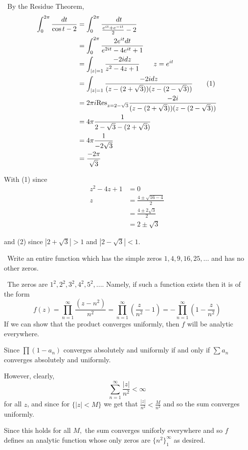 \documentclass[12pt]{Qual}
\begin{document}
\begin{solution}$\,$ By the Residue Theorem,
\begin{align*}
    \int_0^{2\pi}\frac{dt}{\cos t-2}&=\int_0^{2\pi}\frac{dt}{\frac{e^{it}+e^{-it}}{2}-2}\\
    &=\int_0^{2\pi}\frac{2e^{it}dt}{e^{2it}-4e^{it}+1}\\
    &=\int_{|z|=1}\frac{-2idz}{z^2-4z+1}\qquad z=e^{it}\\
    &=\int_{|z|=1}\frac{-2idz}{(z-(2+\sqrt{3}))(z-(2-\sqrt{3}))}\tag{1}\\
    &=2\pi i\text{Res}_{z=2-\sqrt{3}}\frac{-2i}{(z-(2+\sqrt{3}))(z-(2-\sqrt{3}))}\\
    &=4\pi\frac{1}{2-\sqrt{3}-(2+\sqrt{3})}\\
    &=4\pi\frac{1}{-2\sqrt{3}}\\
    &=\frac{-2\pi}{\sqrt{3}}
\end{align*}

With (1) since \begin{align*}
    z^2-4z+1&=0\\
    z&=\frac{4\pm\sqrt{16-4}}{2}\\
    &=\frac{4\pm 2\sqrt{3}}{2}\\
    &=2\pm\sqrt{3}
\end{align*}

and (2) since $|2+\sqrt{3}|>1$ and $|2-\sqrt{3}|<1$.
\end{solution}
\newpage





\begin{problem} $\,$
Write an entire function which has the simple zeros $1,4,9,16,25,...$ and has no other zeros.
\end{problem}


\begin{solution}$\,$
The zeros are $1^2,2^2,3^2,4^2,5^2,...$. Namely, if such a function exists then it is of the form $$f(z)=\prod_{n=1}^\infty\frac{(z-n^2)}{n^2}=\prod_{n=1}^\infty\left(\frac{z}{n^2}-1\right)=-\prod_{n=1}^\infty\left(1-\frac{z}{n^2}\right)$$ If we can show that the product converges uniformly, then $f$ will be analytic everywhere.

Since $\prod(1-a_n)$ converges absolutely and uniformly if and only if $\sum a_n$ converges absolutely and uniformly.

However, clearly, $$\sum_{n=1}^\infty\frac{|z|}{n^2}<\infty$$ for all $z$, and since for $\{|z|<M\}$ we get that $\frac{|z|}{n^2}<\frac{M}{n^2}$ and so the sum converges uniformly.

Since this holds for all $M,$ the sum converges uniforly everywhere and so $f$ defines an analytic function whose only zeros are $\{n^2\}_1^\infty$ as desired.
\end{solution}
\end{document}
